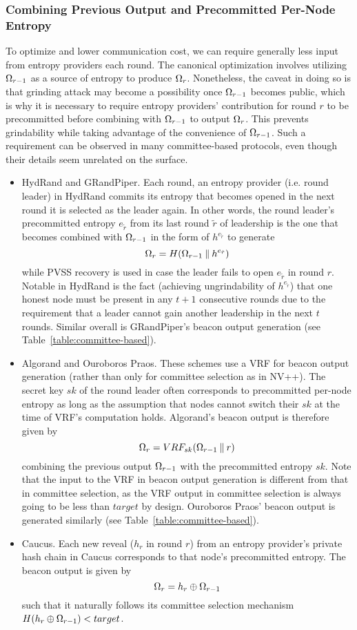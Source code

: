 \subsubsection{Combining Previous Output and Precommitted Per-Node Entropy}
\label{subsubsection:precommitted}
To optimize and lower communication cost, we can require generally less input from entropy providers each round. The canonical optimization involves utilizing $\Omega_{r - 1}$ as a source of entropy to produce $\Omega_{r}$. Nonetheless, the caveat in doing so is that grinding attack may become a possibility once $\Omega_{r - 1}$ becomes public, which is why it is necessary to require entropy providers' contribution for round $r$ to be precommitted before combining with $\Omega_{r - 1}$ to output $\Omega_r$. This prevents grindability while taking advantage of the convenience of $\Omega_{r - 1}$. Such a requirement can be observed in many committee-based protocols, even though their details seem unrelated on the surface.
\begin{itemize}
\item HydRand and GRandPiper. Each round, an entropy provider (i.e. round leader) in HydRand commits its entropy that becomes opened in the next round it is selected as the leader again. In other words, the round leader's precommitted entropy $e_{\tilde{r}}$ from its last round $\tilde{r}$ of leadership is the one that becomes combined with $\Omega_{r - 1}$ in the form of $h^{e_{\tilde{r}}}$ to generate
\[
\Omega_r = H(\Omega_{r - 1} \mathbin\Vert h^{e_{\tilde{r}}})
\]
while PVSS recovery is used in case the leader fails to open $e_{\tilde{r}}$ in round $r$. Notable in HydRand is the fact (achieving ungrindability of $h^{e_{\tilde{r}}}$) that one honest node must be present in any $t + 1$ consecutive rounds due to the requirement that a leader cannot gain another leadership in the next $t$ rounds. Similar overall is GRandPiper's beacon output generation (see Table~\ref{table:committee-based}).
\item Algorand and Ouroboros Praos. These schemes use a VRF for beacon output generation (rather than only for committee selection as in NV++). The secret key $sk$ of the round leader often corresponds to precommitted per-node entropy as long as the assumption that nodes cannot switch their $sk$ at the time of VRF's computation holds. Algorand's beacon output is therefore given by
\[
\Omega_r = VRF_{sk}(\Omega_{r - 1} \mathbin\Vert r)
\]
combining the previous output $\Omega_{r - 1}$ with the precommitted entropy $sk$. Note that the input to the VRF in beacon output generation is different from that in committee selection, as the VRF output in committee selection is always going to be less than $target$ by design. Ouroboros Praos' beacon output is generated similarly (see Table~\ref{table:committee-based}).
\item Caucus. Each new reveal ($h_r$ in round $r$) from an entropy provider's private hash chain in Caucus corresponds to that node's precommitted entropy. The beacon output is given by
\[
\Omega_r = h_r \oplus \Omega_{r - 1}
\]
such that it naturally follows its committee selection mechanism $H(h_r \oplus \Omega_{r - 1}) < target$.
\end{itemize}

